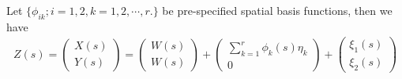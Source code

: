 \documentclass[
]{article}
\begin{document}
Let \(\{\phi_{ik};i = 1, 2, k = 1, 2, \cdots, r.\}\) be pre-specified
spatial basis functions, then we have\\
\begin{equation}
\begin{aligned}
 Z(s) = \left(
                \begin{array}{c}
                  {X\left(s\right)} \\
                  {Y\left(s\right)}
                \end{array}
        \right) =
        \left(
              \begin{array}{c}
                {W(s)} \\
                {W(s)}
              \end{array}
       \right) +
      \left(
              \begin{array}{cc}
                \sum_{k = 1}^{r}\phi_{k}(s)\eta_{k} \\
                 0
              \end{array}
      \right) +
       \left(
              \begin{array}{c}
                {\xi_1(s)} \\
                {\xi_2(s)}
              \end{array}
      \right)
\end{aligned}
\end{equation}
\end{document}
